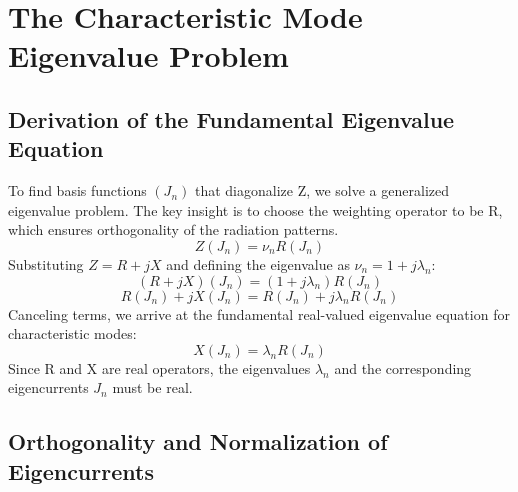 \documentclass[11pt,a4paper]{article}
\begin{document}
\section{The Characteristic Mode Eigenvalue Problem}
\subsection{Derivation of the Fundamental Eigenvalue Equation}

To find basis functions \((J_{n})\) that diagonalize Z, we solve a generalized eigenvalue problem. The key insight is to choose the weighting operator to be R, which ensures orthogonality of the radiation patterns.
\begin{equation}
    Z(J_{n})=\nu_{n}R(J_{n})
\end{equation}
Substituting \(Z=R+jX\) and defining the eigenvalue as \(\nu_{n}=1+j\lambda_{n}\):
\begin{equation}
    (R+jX)(J_{n})=(1+j\lambda_{n})R(J_{n})
\end{equation}
\begin{equation}
    R(J_{n})+jX(J_{n})=R(J_{n})+j\lambda_{n}R(J_{n})
\end{equation}
Canceling terms, we arrive at the fundamental real-valued eigenvalue equation for characteristic modes:
\begin{equation}
    X(J_{n})=\lambda_{n}R(J_{n})
\end{equation}
Since R and X are real operators, the eigenvalues \(\lambda_{n}\) and the corresponding eigencurrents \(J_{n}\) must be real.

\subsection{Orthogonality and Normalization of Eigencurrents}
\end{document}
